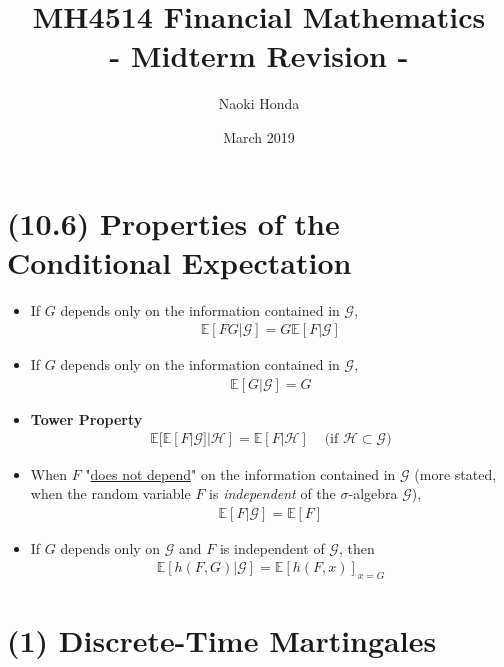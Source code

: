 \documentclass[12pt]{extarticle}
\title{\textbf{MH4514 Financial Mathematics}\\
\Large - Midterm Revision -}
\author{Naoki Honda}
\date{March 2019}
\newcommand{\<}{\langle}
\renewcommand{\>}{\rangle}
\theoremstyle{definition}
\begin{document}
\maketitle


\section{(10.6) Properties of the Conditional Expectation}
\begin{tcolorbox}[enhanced, drop fuzzy shadow, title=Properties of CE]
\begin{itemize}
    \item   If $G$ depends only on the information contained in $\mathcal{G}$,
            \begin{align*}
            \mathbb{E}[FG|\mathcal{G}]=G\mathbb{E}[F|\mathcal{G}]
            \end{align*}
    \item   If $G$ depends only on the information contained in $\mathcal{G}$,
            \begin{align*}
            \mathbb{E}[G|\mathcal{G}]=G
            \end{align*}
    \item   \textbf{Tower Property}
            \begin{align*}
                \mathbb{E}[\mathbb{E}[F|\mathcal{G}]|\mathcal{H}] = \mathbb{E}[F|\mathcal{H}] & \text{\ \ \ \ (if\ } \mathcal{H} \subset \mathcal{G})
            \end{align*}
    \item   When $F$ "\underline{does not depend}" on the information
            contained in $\mathcal{G}$ (more stated, when the random variable $F$ is \textit{independent} of the $\sigma$-algebra $\mathcal{G}$),
            \begin{align*}
             \mathbb{E}[F|\mathcal{G}]=\mathbb{E}[F]
            \end{align*}
    \item   If $G$ depends only on $\mathcal{G}$ 
            and $F$ is independent of $\mathcal{G}$, then
            \begin{align*}
            \mathbb{E}[h(F,G)|\mathcal{G}]=\mathbb{E}[h(F,x)]_{x=G}
            \end{align*}
\end{itemize}
\end{tcolorbox}

\newpage
\section{(1) Discrete-Time Martingales}
\end{document}

